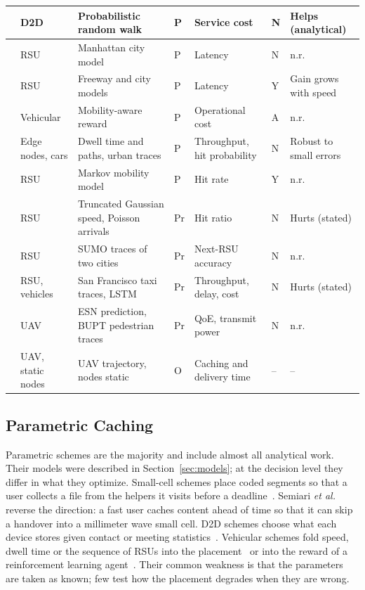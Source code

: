 \begin{table}[!t]
\begin{tabular*}{\textwidth}{@{\extracolsep{\fill}}lllllll@{}}
\cite{hosny2019performance} & D2D & Probabilistic random walk & P & Service cost & N & Helps (analytical) \\
\hline
\cite{alnagar2019city} & RSU & Manhattan city model & P & Latency & N & n.r. \\
\cite{alnagar2022mobility} & RSU & Freeway and city models & P & Latency & Y & Gain grows with speed \\
\cite{tan2018mobility} & Vehicular & Mobility-aware reward & P & Operational cost & A & n.r. \\
\cite{mahmood2019rich} & Edge nodes, cars & Dwell time and paths, urban traces & P & Throughput, hit probability & N & Robust to small errors \\
\cite{wang2024markov} & RSU & Markov mobility model & P & Hit rate & Y & n.r. \\
\cite{yu2021mobility} & RSU & Truncated Gaussian speed, Poisson arrivals & Pr & Hit ratio & N & Hurts (stated) \\
\cite{wangq2022proactive} & RSU & SUMO traces of two cities & Pr & Next-RSU accuracy & N & n.r. \\
\cite{choi2023deep} & RSU, vehicles & San Francisco taxi traces, LSTM & Pr & Throughput, delay, cost & N & Hurts (stated) \\
\hline
\cite{chen2017sky} & UAV & ESN prediction, BUPT pedestrian traces & Pr & QoE, transmit power & N & n.r. \\
\cite{xu2018overcoming} & UAV, static nodes & UAV trajectory, nodes static & O & Caching and delivery time & -- & -- \\
\hline
\end{tabular*}
\end{table}

\subsection{Parametric Caching}
\label{subsec:parametric}

Parametric schemes are the majority and include almost all analytical work. Their models were described in Section~\ref{sec:models}; at the decision level they differ in what they optimize. Small-cell schemes place coded segments so that a user collects a file from the helpers it visits before a deadline~\cite{poularakis2013exploiting,ozfatura2020mobility}. Semiari \emph{et al.}~\cite{semiari2018caching} reverse the direction: a fast user caches content ahead of time so that it can skip a handover into a millimeter wave small cell. D2D schemes choose what each device stores given contact or meeting statistics~\cite{wang2017mobility,wang2018exploiting,hosny2016allerton,hosny2019performance}. Vehicular schemes fold speed, dwell time or the sequence of RSUs into the placement~\cite{alnagar2019city,alnagar2022mobility,mahmood2019rich,wang2024markov} or into the reward of a reinforcement learning agent~\cite{tan2018mobility}. Their common weakness is that the parameters are taken as known; few test how the placement degrades when they are wrong.

